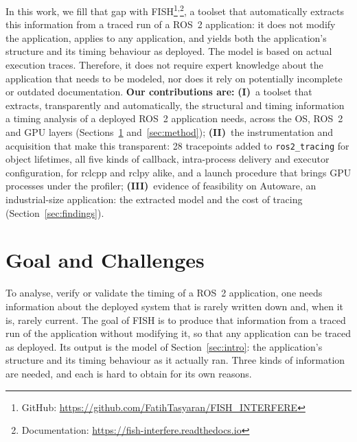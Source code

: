 
In this work, we fill that gap with FISH\footnote{GitHub: \url{https://github.com/FatihTasyaran/FISH_INTERFERE}}\textsuperscript{,}\footnote{Documentation: \url{https://fish-interfere.readthedocs.io}}, a toolset that automatically extracts this information from a traced run of a ROS~2 application: it does not modify the application, applies to any application, and yields both the application's structure and its timing behaviour as deployed. The model is based on actual execution traces. Therefore, it does not require expert knowledge about the application that needs to be modeled, nor does it rely on potentially incomplete or outdated documentation. \textbf{Our contributions are:} \textbf{(I)}~a toolset that extracts, transparently and automatically, the structural and timing information a timing analysis of a deployed ROS~2 application needs, across the OS, ROS~2 and GPU layers (Sections~\ref{sec:goal} and~\ref{sec:method}); \textbf{(II)}~the instrumentation and acquisition that make this transparent: 28 tracepoints added to \texttt{ros2\_tracing} for object lifetimes, all five kinds of callback, intra-process delivery and executor configuration, for rclcpp and rclpy alike, and a launch procedure that brings GPU processes under the profiler; \textbf{(III)}~evidence of feasibility on Autoware, an industrial-size application: the extracted model and the cost of tracing (Section~\ref{sec:findings}).

\section{Goal and Challenges}
\label{sec:goal}
To analyse, verify or validate the timing of a ROS~2 application, one needs information about the deployed system that is rarely written down and, when it is, rarely current. The goal of FISH is to produce that information from a traced run of the application without modifying it, so that any application can be traced as deployed. Its output is the model of Section~\ref{sec:intro}: the application's structure and its timing behaviour as it actually ran. Three kinds of information are needed, and each is hard to obtain for its own reasons.

